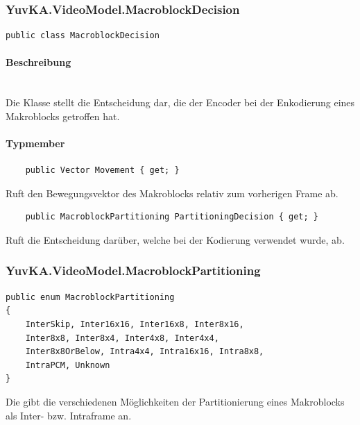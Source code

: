 \subsubsection{YuvKA.VideoModel.MacroblockDecision}

\begin{verbatim}
public class MacroblockDecision
\end{verbatim}

\paragraph{Beschreibung}~\\
Die Klasse  stellt die Entscheidung dar, die der Encoder bei der Enkodierung eines Makroblocks getroffen hat.

\paragraph{Typmember}
\begin{itemize}

	\begin{verbatim}
	public Vector Movement { get; }
	\end{verbatim}
	Ruft den Bewegungsvektor des Makroblocks relativ zum vorherigen Frame ab.

	\begin{verbatim}
	public MacroblockPartitioning PartitioningDecision { get; }
	\end{verbatim}
	Ruft die Entscheidung darüber, welche  bei der Kodierung verwendet wurde, ab.

\end{itemize}

\subsubsection{YuvKA.VideoModel.MacroblockPartitioning}

\begin{verbatim}
public enum MacroblockPartitioning
{
    InterSkip, Inter16x16, Inter16x8, Inter8x16,
    Inter8x8, Inter8x4, Inter4x8, Inter4x4,
    Inter8x8OrBelow, Intra4x4, Intra16x16, Intra8x8,
    IntraPCM, Unknown
}
\end{verbatim}
Die  gibt die verschiedenen Möglichkeiten der Partitionierung eines Makroblocks als Inter- bzw. Intraframe an.
